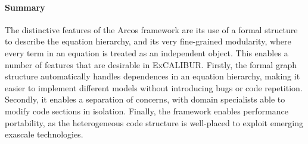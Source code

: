 \paragraph{Summary}
The distinctive features of the Arcos framework are its use of a formal structure to describe the equation hierarchy, and its very fine-grained modularity, where every term in an equation is treated as an independent object.
This enables a number of features that are desirable in ExCALIBUR.
Firstly, the formal graph structure automatically handles dependences in an equation hierarchy, making it easier to implement different models without introducing bugs or code repetition.
Secondly, it enables a separation of concerns, with domain specialists able to modify code sections in isolation.
Finally, the framework enables performance portability, as the heterogeneous code structure is well-placed to exploit emerging exascale technologies.

